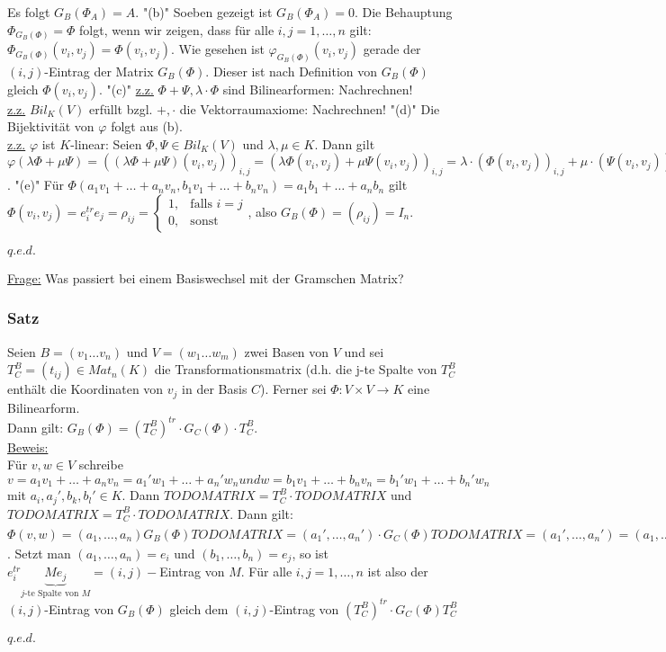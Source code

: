 \documentclass[a4paper]{article}
\newcommand{\ul}{\underline}
\renewcommand{\proof}{\ul{Beweis:}\\}
\renewcommand{\qed}{\begin{flushright}
\ul{\(q.e.d.\)}
\end{flushright}}
\let\phi\varphi
\begin{document}
Es folgt \(G_B(\Phi_A)=A\).
"(b)" Soeben gezeigt ist \(G_B(\Phi_A)=0\). Die Behauptung \(\Phi_{G_B(\Phi)}=\Phi\) folgt, wenn wir zeigen, dass für alle \(i,j=1,\dots,n\) gilt:\(\Phi_{G_B(\Phi)}(v_i,v_j)=\Phi(v_i,v_j)\). Wie gesehen ist \(\phi_{G_B(\Phi)}(v_i,v_j)\) gerade der \((i,j)\)-Eintrag der Matrix \(G_B(\Phi)\). Dieser ist nach Definition von \(G_B(\Phi)\) gleich \(\Phi(v_i,v_j)\).
"(c)" \ul{z.z.} \(\Phi+\Psi,\lambda\cdot\Phi\) sind Bilinearformen: Nachrechnen!\\
\ul{z.z.} \(Bil_K(V)\) erfüllt bzgl. \(+,\cdot\) die Vektorraumaxiome: Nachrechnen!
"(d)" Die Bijektivität von \(\phi\) folgt aus (b).\\
\ul{z.z.} \(\phi\) ist \(K\)-linear: Seien \(\Phi,\Psi\in Bil_K(V)\) und \(\lambda,\mu\in K\). Dann gilt \(\phi(\lambda\Phi+\mu\Psi)=((\lambda\Phi+\mu\Psi)(v_i,v_j))_{i,j}=(\lambda\Phi(v_i,v_j)+\mu\Psi(v_i,v_j))_{i,j}=\lambda\cdot(\Phi(v_i,v_j))_{i,j}+\mu\cdot(\Psi(v_i,v_j))_{i,j}=\lambda\phi(\Phi)+\mu\phi(\Psi)\).
"(e)" Für \(\Phi(a_1v_1+\dots+a_nv_n,b_1v_1+\dots+b_nv_n)=a_1b_1+\dots+a_nb_n\) gilt \(\Phi(v_i,v_j)=e_i^{tr}e_j=\rho_{ij}=\begin{cases}
1,& \text{falls }i=j\\
0,& \text{sonst}
\end{cases}\), also \(G_B(\Phi)=(\rho_{ij})=I_n\).
\qed
\ul{Frage:} Was passiert bei einem Basiswechsel mit der Gramschen Matrix?
\subsubsection{Satz}
Seien \(B=(v_1 \dots v_n)\) und \(V=(w_1 \dots w_m)\) zwei Basen von \(V\) und sei \(T_C^B=(t_{ij})\in Mat_n(K)\) die Transformationsmatrix (d.h. die j-te Spalte von \(T_C^B\) enthält die Koordinaten von \(v_j\) in der Basis \(C\)). Ferner sei \(\Phi:V\times V\rightarrow K\) eine Bilinearform.\\
Dann gilt: \(G_B(\Phi)=(T_C^B)^{tr}\cdot G_C(\Phi)\cdot T_C^B\).\\
\proof
Für \(v,w\in V\) schreibe \(v=a_1v_1+\dots+a_nv_n=a_1'w_1+\dots+a_n'w_n und w=b_1v_1+\dots+b_nv_n=b_1'w_1+\dots+b_n'w_n \) mit \(a_i,a_j',b_k,b_l'\in K\). Dann
\(TODO MATRIX
=T_C^B\cdot TODO MATRIX\) und \(TODO MATRIX = T_C^B\cdot TODO MATRIX\). Dann gilt: \(\Phi(v,w)=(a_1,\dots,a_n)G_B(\Phi) TODO MATRIX = (a_1',\dots,a_n')\cdot G_C(\Phi) TODO MATRIX=(a_1',\dots,a_n')=(a_1,\dots,a_n)\cdot (T_C^B)^{tr} =(a_1,\dots,a_n)(T_C^B)^{tr}\cdot G_C(\Phi)\cdot T_C^B TODO MATRIX\). Setzt man \((a_1,\dots,a_n)=e_i\) und \((b_1,\dots,b_n)=e_j\), so ist \(e_i^{tr}\underbrace{Me_j}_{j\text{-te Spalte von } M}=(i,j)-\)Eintrag von \(M\). Für alle \(i,j=1,\dots,n\) ist also der \((i,j)\)-Eintrag von \(G_B(\Phi)\) gleich dem \((i,j)\)-Eintrag von \((T_C^B)^{tr}\cdot G_C(\Phi)T_C^B\)
\qed
\end{document}
